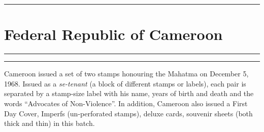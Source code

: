 \documentclass[a4paper]{article}
\begin{document}
\begin{landscape}
  \hrule
\section*{Federal Republic of Cameroon}
\vspace{8pt}
\hrule
\vspace{11.5cm}
\begin{center}
  \begin{minipage}{17cm}
    \hrule \vspace{12pt} Cameroon issued a set of two stamps honouring
    the Mahatma on December 5, 1968. Issued as a {\it se-tenant} (a
    block of different stamps or labels), each pair is separated by a
    stamp-size label with his name, years of birth and death and the
    words ``Advocates of Non-Violence''. In addition, Cameroon also
    issued a First Day Cover, Imperfs (un-perforated stamps), deluxe
    cards, souvenir sheets (both thick and thin) in this batch.
  \end{minipage}
\end{center}

\end{landscape}
\end{document}

